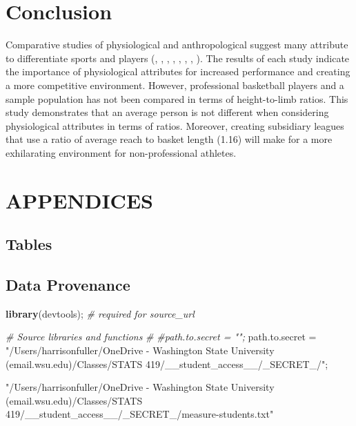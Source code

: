 \documentclass[]{article}
\newenvironment{Shaded}{\begin{snugshade}}{\end{snugshade}}
\newcommand{\CommentTok}[1]{\textcolor[rgb]{0.56,0.35,0.01}{\textit{#1}}}
\newcommand{\KeywordTok}[1]{\textcolor[rgb]{0.13,0.29,0.53}{\textbf{#1}}}
\newcommand{\NormalTok}[1]{#1}
\newcommand{\StringTok}[1]{\textcolor[rgb]{0.31,0.60,0.02}{#1}}
\begin{document}
\section{Conclusion}
\label{sec:conclusion}

Comparative studies of physiological and anthropological suggest many
attribute to differentiate sports and players (\citep{vaquera:2015},
\citep{masanovic:2018}, \citep{korkmaz:2020}, \citep{drinkwater:2008},
\citep{strumbelj:2014}, \citep{ljubojevic:2020}, \citep{gryko:2018},
\citep{bayios:2006}). The results of each study indicate the importance
of physiological attributes for increased performance and creating a
more competitive environment. However, professional basketball players
and a sample population has not been compared in terms of height-to-limb
ratios. This study demonstrates that an average person is not different
when considering physiological attributes in terms of ratios. Moreover,
creating subsidiary leagues that use a ratio of average reach to basket
length (1.16) will make for a more exhilarating environment for
non-professional athletes.

\newpage

\section{APPENDICES}
\label{sec:appendix}

\subsection{Tables}
\label{sec:appendix-table}



\newpage
\subsection{Data Provenance}
\label{sec:appendix-data-provenance}

\begin{Shaded}
\begin{Highlighting}[]
\KeywordTok{library}\NormalTok{(devtools);       }\CommentTok{# required for source_url}

\CommentTok{# Source libraries and functions}
\CommentTok{# }
\CommentTok{#path.to.secret = "";}
\NormalTok{path.to.secret =}\StringTok{ "/Users/harrisonfuller/OneDrive - Washington State University (email.wsu.edu)/Classes/STATS 419/__student_access__/_SECRET_/"}\NormalTok{;}

\StringTok{"/Users/harrisonfuller/OneDrive - Washington State University (email.wsu.edu)/Classes/STATS 419/__student_access__/_SECRET_/measure-students.txt"}
\end{Highlighting}
\end{Shaded}
\end{document}
